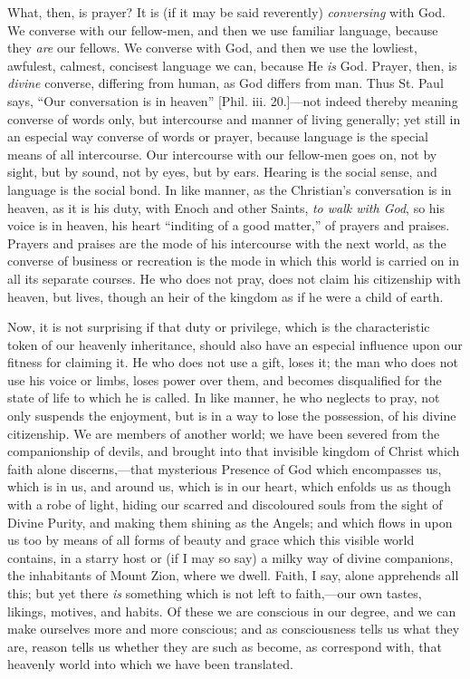 What, then, is prayer? It is (if it may be said reverently) \emph{conversing}
with God. We converse with our fellow-men, and then we use familiar
language, because they \emph{are} our fellows. We converse with God,
and then we use the lowliest, awfulest, calmest, concisest language we
can, because He \emph{is} God. Prayer, then, is \emph{divine}
converse, differing from human, as God differs from man. Thus St. Paul
says, ``Our conversation is in heaven'' [Phil. iii. 20.]—not
indeed thereby meaning converse of words only, but intercourse and
manner of living generally; yet still in an especial way converse of
words or prayer, because language is the special means of all
intercourse. Our intercourse with our fellow-men goes on, not by
sight, but by sound, not by eyes, but by ears. Hearing is the social
sense, and language is the social bond. In like manner, as the
Christian's conversation is in heaven, as it is his duty, with Enoch
and other Saints, \emph{to walk with God}, so his voice is in heaven,
his heart ``inditing of a good matter,'' of prayers and
praises. Prayers and praises are the mode of his intercourse with the
next world, as the converse of business or recreation is the mode in
which this world is carried on in all its separate courses. He who
does not pray, does not claim his citizenship with heaven, but lives,
though an heir of the kingdom as if he were a child of earth.

Now, it is not surprising if that duty or privilege, which is the
characteristic token of our heavenly inheritance, should also have an
especial influence upon our fitness for claiming it. He who does not
use a gift, loses it; the man who does not use his voice or limbs,
loses power over them, and becomes disqualified for the state of life
to which he is called. In like manner, he who neglects to pray, not
only suspends the enjoyment, but is in a way to lose the possession,
of his divine citizenship. We are members of another world; we have
been severed from the companionship of devils, and brought into that
invisible kingdom of Christ which faith alone discerns,—that
mysterious Presence of God which encompasses us, which is in us, and
around us, which is in our heart, which enfolds us as though with a
robe of light, hiding our scarred and discoloured souls from the sight
of Divine Purity, and making them shining as the Angels; and which
flows in upon us too by means of all forms of beauty and grace which
this visible world contains, in a starry host or (if I may so say) a
milky way of divine companions, the inhabitants of Mount Zion, where
we dwell. Faith, I say, alone apprehends all this; but yet there \emph{is}
something which is not left to faith,—our own tastes, likings,
motives, and habits. Of these we are conscious in our degree, and we
can make ourselves more and more conscious; and as consciousness tells
us what they are, reason tells us whether they are such as become, as
correspond with, that heavenly world into which we have been
translated.

